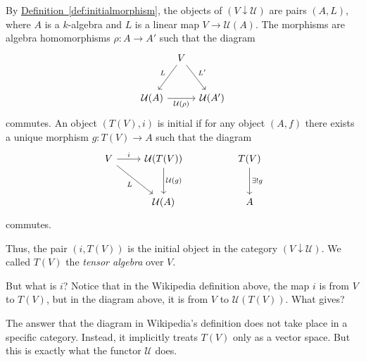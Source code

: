 \documentclass[notes.tex]{subfiles}
\begin{document}
\begin{example}
  By \hyperref[def:initialmorphism]{Definition~\ref*{def:initialmorphism}}, the objects of $(V \downarrow \mathcal{U})$ are pairs $(A, L)$, where $A$ is a $k$-algebra and $L$ is a linear map $V \to \mathcal{U}(A)$. The morphisms are algebra homomorphisms $\rho\colon A \to A'$ such that the diagram
  \begin{equation*}
    \begin{tikzcd}[column sep=tiny, row sep=6ex]
      & V \arrow[dl, swap, "L"] \arrow[dr, "L'"] & \\
      \mathcal{U}(A) \arrow[rr, swap, "\mathcal{U}(\rho)"] & & \mathcal{U}(A')
    \end{tikzcd}
  \end{equation*}
  commutes. An object $(T(V), i)$ is initial if for any object $(A, f)$ there exists a unique morphism $g\colon T(V) \to A$ such that the diagram
  \begin{equation*}
    \begin{tikzcd}[row sep=large]
      V \arrow[r, "i"] \arrow[dr, swap, "L"] & \mathcal{U}(T(V)) \arrow[d, "\mathcal{U}(g)"] & & T(V) \arrow[d, "\exists!g"] \\
      & \mathcal{U}(A) & & A
    \end{tikzcd}
  \end{equation*}
  commutes.

  Thus, the pair $(i, T(V))$ is the initial object in the category $(V \downarrow \mathcal{U})$. We called $T(V)$ the \emph{tensor algebra} over $V$.

  But what is $i$? Notice that in the Wikipedia definition above, the map $i$ is from $V$ to $T(V)$, but in the diagram above, it is from $V$ to $\mathcal{U}(T(V))$. What gives?

  The answer that the diagram in Wikipedia's definition does not take place in a specific category. Instead, it implicitly treats $T(V)$ only as a vector space. But this is exactly what the functor $\mathcal{U}$ does.
\end{example}
\end{document}
